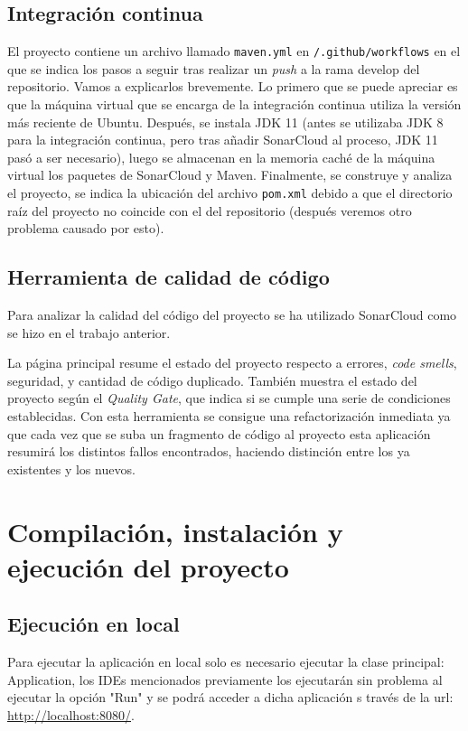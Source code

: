 \subsection{Integración continua}
El proyecto contiene un archivo llamado \texttt{maven.yml} en \texttt{/.github/workflows} en el que se indica los pasos a seguir tras realizar un \textit{push} a la rama develop del repositorio. Vamos a explicarlos brevemente. 
Lo primero que se puede apreciar es que la máquina virtual que se encarga de la integración continua utiliza la versión más reciente de Ubuntu. Después, se instala JDK 11 (antes se utilizaba JDK 8 para la integración continua, pero tras añadir SonarCloud al proceso, JDK 11 pasó a ser necesario), luego se almacenan en la memoria caché de la máquina virtual los paquetes de SonarCloud y Maven. Finalmente, se construye y analiza el proyecto, se indica la ubicación del archivo \texttt{pom.xml} debido a que el directorio raíz del proyecto no coincide con el del repositorio (después veremos otro problema causado por esto).
\subsection{Herramienta de calidad de código}
Para analizar la calidad del código del proyecto se ha utilizado SonarCloud como se hizo en el trabajo anterior.

La página principal resume el estado del proyecto respecto a errores, \textit{code smells}, seguridad, y cantidad de código duplicado. También muestra el estado del proyecto según el \textit{Quality Gate}, que indica si se cumple una serie de condiciones establecidas.
Con esta herramienta se consigue una refactorización inmediata ya que cada vez que se suba un fragmento de código al proyecto esta aplicación resumirá los distintos fallos encontrados, haciendo distinción entre los ya existentes y los nuevos.

\section{Compilación, instalación y ejecución del proyecto}
\subsection{Ejecución en local}
Para ejecutar la aplicación en local solo es necesario ejecutar la clase principal: Application, los IDEs mencionados previamente los ejecutarán sin problema al ejecutar la opción "Run" y se podrá acceder a dicha aplicación s través de la url: \url{http://localhost:8080/}.

